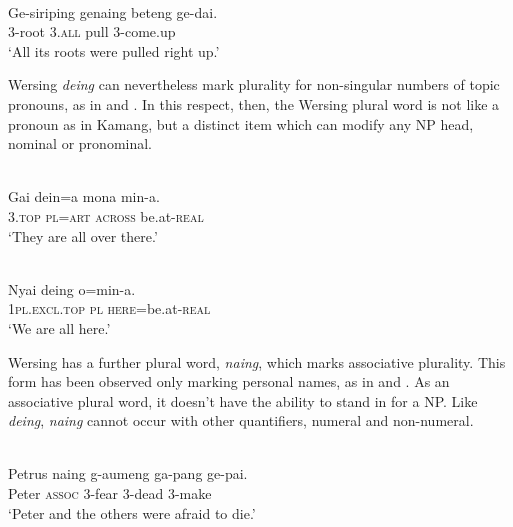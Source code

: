\ea%
\label{ex:9:60}
 \\
\gll  Ge-siriping genaing beteng ge-dai. \\
 \textsc{3-}root \textsc{3.all}   pull 3-come.up    \\
\glt `All its roots were pulled right up.'
\z





Wersing \textit{d}\textit{eing} can nevertheless mark plurality for non-singular numbers of topic pronouns, as in  and . In this respect, then, the Wersing plural word is not like a pronoun as in Kamang, but a distinct item which can modify any NP head, nominal or pronominal.


\ea%
\label{ex:9:61}
 \\
\gll  Gai dein=a mona min-a. \\
   \textsc{3.top} \textsc{pl}=\textsc{art} \textsc{across} be.at-\textsc{real}  \\
\glt `They are all over there.'
\z







\ea%
\label{ex:9:62}
 \\
\gll  Nyai deing o=min-a. \\
  \textsc{1pl.excl.top} \textsc{pl}   \textsc{here}=be.at-\textsc{real}   \\
\glt `We are all here.'
\z






Wersing has a further plural word, \textit{naing}, which marks associative plurality. This form has been observed only marking personal names, as in  and . As an associative plural word, it doesn't have the ability to stand in for a NP. Like \textit{deing}, \textit{naing} cannot occur with other quantifiers, numeral and non-numeral.


\ea%
\label{ex:9:63}
 \\
\gll  Petrus naing g-aumeng ga-pang ge-pai. \\
  Peter \textsc{assoc} 3-fear 3-dead 3-make   \\
\glt `Peter and the others were afraid to die.'
\z







